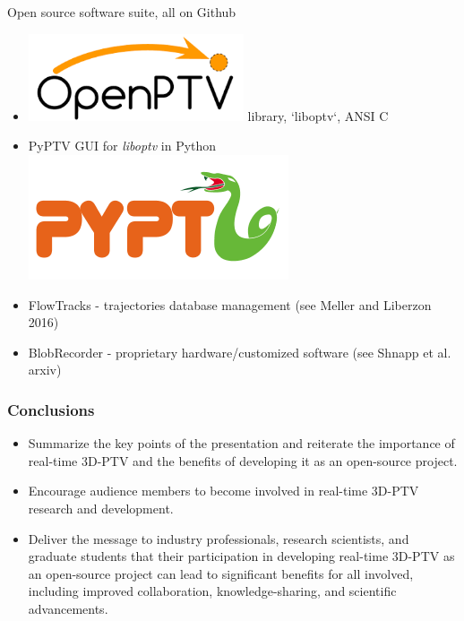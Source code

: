 \documentclass[aspectratio=43]{beamer}
\begin{document}
	 

\begin{frame}[label=opensource-1]{Open source software suite, all on Github}
\begin{itemize}
\item \includegraphics[width=0.5\textwidth]{openptv} \hspace{1em} library, `liboptv`, ANSI C
\item PyPTV GUI for {\em liboptv} in Python \includegraphics[width=.3\textwidth]{pyptv}
\item FlowTracks - trajectories database management (see Meller and Liberzon 2016)
\item BlobRecorder - proprietary hardware/customized software (see Shnapp et al. arxiv)
\end{itemize}
\end{frame}


\begin{frame}
\frametitle{Conclusions}
\begin{itemize}
\item Summarize the key points of the presentation and reiterate the importance of real-time 3D-PTV and the benefits of developing it as an open-source project.
\item Encourage audience members to become involved in real-time 3D-PTV research and development.
\item Deliver the message to industry professionals, research scientists, and graduate students that their participation in developing real-time 3D-PTV as an open-source project can lead to significant benefits for all involved, including improved collaboration, knowledge-sharing, and scientific advancements.
\end{itemize}
\end{frame}
\end{document}
